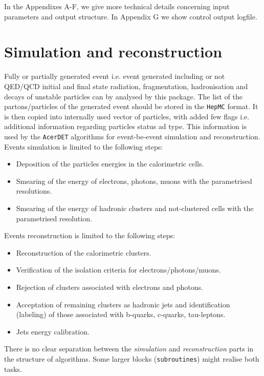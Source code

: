 In the Appendixes A-F, we give more technical details concerning input parameters 
and output structure. In  Appendix G we show control output logfile.  
 

\boldmath
\section{Simulation and reconstruction}
\unboldmath

Fully or partially generated event i.e. event generated including 
or not QED/QCD initial and final state radiation, fragmentation,
hadronisation and decays of unstable particles can by analysed by 
this package. The list of the partons/particles of the generated event should
be stored in the {\tt HepMC} format. It is then copied into internally used 
vector of particles, with added few flags  i.e. additional information regarding
particles status ad type. This information is used by the {\tt AcerDET} algorithms 
for event-be-event simulation and reconstruction.\\
Events simulation is limited to the following steps:
\begin{itemize}
\item
Deposition of the particles energies in the calorimetric cells.
\item
Smearing of the energy of electrons, photons, muons with the parametrised
resolutions.
\item
Smearing of the energy of hadronic clusters and not-clustered cells
with the parametrised resolution.
\end{itemize}
Events reconstruction is limited to the following steps:
\begin{itemize}
\item
Reconstruction of the calorimetric clusters.
\item
Verification of the isolation criteria for electrons/photons/muons.
\item
Rejection of clusters associated with electrons and photons.
\item
Acceptation of remaining clusters as hadronic jets and identification
 (labeling)  of those associated with b-quarks, c-quarks, tau-leptons.
\item 
Jets energy calibration.
\end{itemize}
There is no clear separation between the {\it simulation} and {\it
reconstruction} parts in the structure of algorithms. Some larger
blocks ({\tt subroutines}) might realise both tasks.

